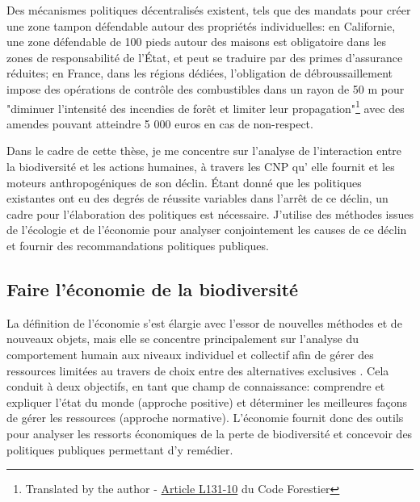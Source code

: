 Des mécanismes politiques décentralisés existent, tels que des mandats pour créer une zone tampon défendable autour des propriétés individuelles: en Californie, une zone défendable de 100 pieds autour des maisons est obligatoire dans les zones de responsabilité de l'État, et peut se traduire par des primes d'assurance réduites; en France, dans les régions dédiées, l'obligation de débroussaillement impose des opérations de contrôle des combustibles dans un rayon de 50 m pour "diminuer l'intensité des incendies de forêt et limiter leur propagation"\footnote{Translated by the author - \href{https://www.legifrance.gouv.fr/codes/article_lc/LEGIARTI000047809197}{Article L131-10} du Code Forestier} avec des amendes pouvant atteindre 5 000 euros en cas de non-respect.

Dans le cadre de cette thèse, je me concentre sur l'analyse de l'interaction entre la biodiversité et les actions humaines, à travers les CNP qu' elle fournit et les moteurs anthropogéniques de son déclin. Étant donné que les politiques existantes ont eu des degrés de réussite variables dans l'arrêt de ce déclin, un cadre pour l'élaboration des politiques est nécessaire. J'utilise des méthodes issues de l'écologie et de l'économie pour analyser conjointement les causes de ce déclin et fournir des recommandations politiques publiques.  


{}
\subsection*{Faire l'économie de la biodiversité}

La définition de l'économie s'est élargie avec l'essor de nouvelles méthodes et de nouveaux objets, mais elle se concentre principalement sur l'analyse du comportement humain aux niveaux individuel et collectif afin de gérer des ressources limitées au travers de choix entre des alternatives exclusives \citep{mankiw_principles_2011, bade_foundations_2002, backhouse_retrospectives_2009}. Cela conduit à deux objectifs, en tant que champ de connaissance: comprendre et expliquer l'état du monde (approche positive) et déterminer les meilleures façons de gérer les ressources (approche normative). L'économie fournit donc des outils pour analyser les ressorts économiques de la perte de biodiversité et concevoir des politiques publiques permettant d'y remédier.

